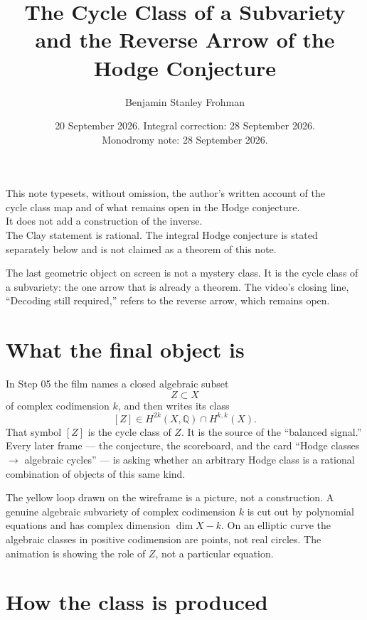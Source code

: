 \documentclass[11pt,a4paper]{article}
\title{\textbf{The Cycle Class of a Subvariety\\[0.25em]
and the Reverse Arrow of the Hodge Conjecture}}
\author{Benjamin Stanley Frohman}
\date{20 September 2026. Integral correction: 28 September 2026.\\ Monodromy note: 28 September 2026.}
\newcommand{\Q}{\mathbb{Q}}
\begin{document}
\maketitle

\begin{center}
\small
This note typesets, without omission, the author's written account of the\\
cycle class map and of what remains open in the Hodge conjecture.\\
It does not add a construction of the inverse.\\
The Clay statement is rational. The integral Hodge conjecture is stated\\
separately below and is not claimed as a theorem of this note.
\end{center}

\vspace{0.8em}

\noindent
The last geometric object on screen is not a mystery class. It is the cycle class of a subvariety: the one arrow that is already a theorem. The video's closing line, ``Decoding still required,'' refers to the reverse arrow, which remains open.

\section*{What the final object is}

In Step 05 the film names a closed algebraic subset
\[
Z\subset X
\]
of complex codimension \(k\), and then writes its class
\[
[Z]\in H^{2k}(X,\Q)\cap H^{k,k}(X).
\]
That symbol \([Z]\) is the cycle class of \(Z\). It is the source of the ``balanced signal.'' Every later frame --- the conjecture, the scoreboard, and the card ``Hodge classes \(\to\) algebraic cycles'' --- is asking whether an arbitrary Hodge class is a rational combination of objects of this same kind.

The yellow loop drawn on the wireframe is a picture, not a construction. A genuine algebraic subvariety of complex codimension \(k\) is cut out by polynomial equations and has complex dimension \(\dim X-k\). On an elliptic curve the algebraic classes in positive codimension are points, not real circles. The animation is showing the role of \(Z\), not a particular equation.

\section*{How the class is produced}
\end{document}

